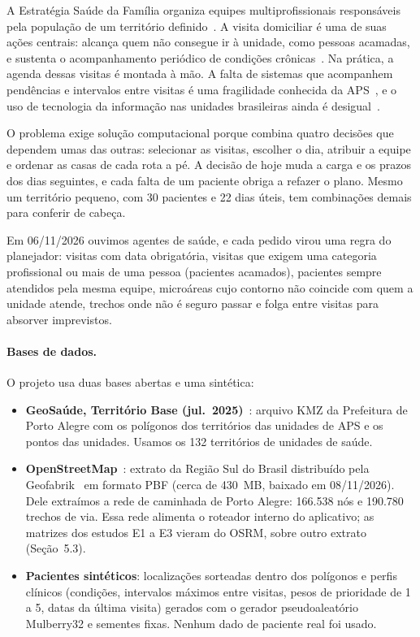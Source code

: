 \documentclass[11pt,a4paper]{article}
\begin{document}
A Estratégia Saúde da Família organiza equipes multiprofissionais responsáveis pela população de um território definido~\cite{pnab2017,faria2020}. A visita domiciliar é uma de suas ações centrais: alcança quem não consegue ir à unidade, como pessoas acamadas, e sustenta o acompanhamento periódico de condições crônicas~\cite{conass2021}. Na prática, a agenda dessas visitas é montada à mão. A falta de sistemas que acompanhem pendências e intervalos entre visitas é uma fragilidade conhecida da APS~\cite{rodrigues2014}, e o uso de tecnologia da informação nas unidades brasileiras ainda é desigual~\cite{bender2021,pinto2024}.

O problema exige solução computacional porque combina quatro decisões que dependem umas das outras: selecionar as visitas, escolher o dia, atribuir a equipe e ordenar as casas de cada rota a pé. A decisão de hoje muda a carga e os prazos dos dias seguintes, e cada falta de um paciente obriga a refazer o plano. Mesmo um território pequeno, com 30 pacientes e 22 dias úteis, tem combinações demais para conferir de cabeça.

Em 06/11/2026 ouvimos agentes de saúde, e cada pedido virou uma regra do planejador: visitas com data obrigatória, visitas que exigem uma categoria profissional ou mais de uma pessoa (pacientes acamados), pacientes sempre atendidos pela mesma equipe, microáreas cujo contorno não coincide com quem a unidade atende, trechos onde não é seguro passar e folga entre visitas para absorver imprevistos.

\paragraph{Bases de dados.} O projeto usa duas bases abertas e uma sintética:
\begin{itemize}
    \item \textbf{GeoSaúde, Território Base (jul.\ 2025)}~\cite{geosaude}: arquivo KMZ da Prefeitura de Porto Alegre com os polígonos dos territórios das unidades de APS e os pontos das unidades. Usamos os 132 territórios de unidades de saúde.
    \item \textbf{OpenStreetMap}~\cite{haklay2008}: extrato da Região Sul do Brasil distribuído pela Geofabrik~\cite{geofabrik} em formato PBF (cerca de 430~MB, baixado em 08/11/2026). Dele extraímos a rede de caminhada de Porto Alegre: 166.538 nós e 190.780 trechos de via. Essa rede alimenta o roteador interno do aplicativo; as matrizes dos estudos E1 a E3 vieram do OSRM, sobre outro extrato (Seção~5.3).
    \item \textbf{Pacientes sintéticos}: localizações sorteadas dentro dos polígonos e perfis clínicos (condições, intervalos máximos entre visitas, pesos de prioridade de 1 a 5, datas da última visita) gerados com o gerador pseudoaleatório Mulberry32 e sementes fixas. Nenhum dado de paciente real foi usado.
\end{itemize}
\end{document}
